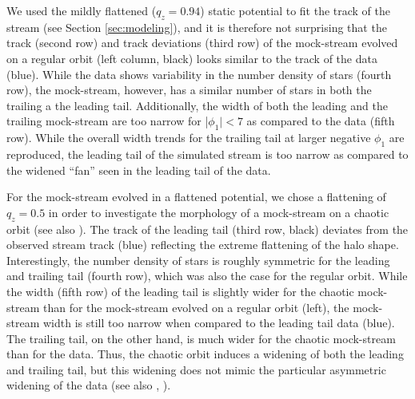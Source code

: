 \documentclass[twocolumn]{aastex62}
\newcommand{\sa}[1]{{\color{magenta} SP: #1}}
\begin{document}
\begin{figure}
{%
}
\label{fig:sims}
\end{figure}


We used the mildly flattened ($q_z = 0.94$) static potential to fit the track of the stream (see Section \ref{sec:modeling}), and it is therefore not surprising that the track (second row) and track deviations (third row) of the mock-stream evolved on a regular orbit (left column, black) looks similar to the track of the data (blue).
While the data shows variability in the number density of stars (fourth row), the mock-stream, however, has a similar number of stars in both the trailing a the leading tail.
Additionally, the width of both the leading and the trailing mock-stream are too narrow for |$\phi_1| < 7$ as compared to the data (fifth row).
While the overall width trends for the trailing tail  at larger negative $\phi_1$ are reproduced, the leading tail of the simulated stream is too narrow as compared to the widened ``fan'' seen in the leading tail of the data.

For the mock-stream evolved in a flattened potential,
we chose a flattening of $q_z = 0.5$  in order to investigate the morphology of a mock-stream on a chaotic orbit (see also \citealt{Fardal:2015}).
The track of the leading tail (third row, black) deviates from the observed stream track (blue) reflecting the extreme flattening of the halo shape.
Interestingly, the number density of stars is roughly symmetric for the leading and trailing tail  (fourth row), which was also the case for the regular orbit. 
While the width (fifth row) of the leading tail is slightly wider for the chaotic mock-stream than for the mock-stream evolved on a regular orbit (left), the mock-stream width is still too narrow when compared to the leading tail data (blue).
The trailing tail, on the other hand, is much wider for the chaotic mock-stream than for the data.
Thus, the chaotic orbit induces a widening of both the leading and trailing tail, but this widening does not mimic the particular asymmetric widening of the data (see also \citealt{Pearson:2015}, \citealt{Price-Whelan:2016}).
\end{document}
